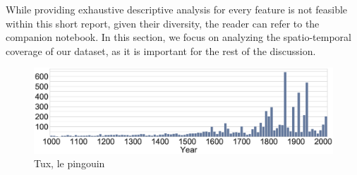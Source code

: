 While providing exhaustive descriptive analysis for every feature is not feasible within this short report, given their diversity, the reader can refer to the companion notebook. In this section, we focus on analyzing the spatio-temporal coverage of our dataset, as it is important for the rest of the discussion.

\begin{figure}[!h]
	\centering
	\includegraphics{figures/temporal_coverage.eps}
	\caption{Tux, le pingouin}
	\label{Tux}
\end{figure}